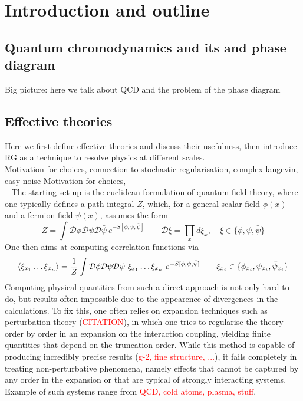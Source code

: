 \chapter{Introduction and outline}
\label{chap:introduction}

\section{Quantum chromodynamics and its and phase diagram}
Big picture: here we talk about QCD and the problem of the phase diagram
\section{Effective theories}
Here we first define effective theories and discuss their usefulness, then introduce RG as a technique to resolve physics at different scales. \\
\vspace{20pt}
Motivation for choices, connection to stochastic regularisation, complex langevin, easy noise \cite{boo}
Motivation for choices, \\ ~
The starting set up is the euclidean formulation of quantum field theory, where one typically defines a path integral $Z$, which, for a general scalar field $\phi(x)$ and a fermion field $\psi(x)$, assumes the form
\begin{equation}
    Z = \int \mathcal{D}\phi\mathcal{D}\psi\mathcal{D}\bar\psi \ e^{-S[\phi, \psi, \bar\psi]} \qquad \mathcal{D}\xi = \prod_x d\xi_x, \quad \xi \in \{\phi, \psi, \bar\psi\}
    \label{eq:path_integral_generic}
\end{equation}
One then aims at computing correlation functions via
\begin{equation*}
        \left\langle \xi_{x_1} \dots \xi_{x_n}  \right\rangle = \frac{1}{Z} \int \mathcal{D}\phi\mathcal{D}\psi\mathcal{D}\psi \ \xi_{x_1} \dots \xi_{x_n} \ e^{-S[\phi, \psi, \bar\psi]} \qquad \xi_{x_i} \in \{\phi_{x_i}, \psi_{x_i}, \bar\psi_{x_i}\} \\
\end{equation*}
Computing physical quantities from such a direct approach is not only hard to do, but results often impossible due to the appearence of divergences in the calculations. To fix this, one often relies on expansion techniques such as perturbation theory (\textcolor{red}{CITATION}), in which one tries to regularise the theory order by order in an expansion on the interaction coupling, yielding finite quantities that depend on the truncation order.  While this method is capable of producing incredibly precise results (\textcolor{red}{g-2, fine structure, ...}), it fails completely in treating non-perturbative phenomena, namely effects that cannot be captured by any order in the expansion or that are typical of strongly interacting systems. Example of such systems range from \textcolor{red}{QCD, cold atoms, plasma, stuff}. 
